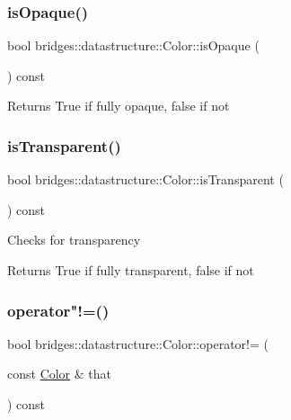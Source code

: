 \subsubsection{\texorpdfstring{is\+Opaque()}{isOpaque()}}
{\footnotesize\ttfamily bool bridges\+::datastructure\+::\+Color\+::is\+Opaque (\begin{DoxyParamCaption}{ }\end{DoxyParamCaption}) const\hspace{0.3cm}{\ttfamily [inline]}}

\begin{DoxyReturn}{Returns}
True if fully opaque, false if not 
\end{DoxyReturn}
\mbox{\label{classbridges_1_1datastructure_1_1_color_a82713b25585724ddcb73d3c209aaaad9}} 
\subsubsection{\texorpdfstring{is\+Transparent()}{isTransparent()}}
{\footnotesize\ttfamily bool bridges\+::datastructure\+::\+Color\+::is\+Transparent (\begin{DoxyParamCaption}{ }\end{DoxyParamCaption}) const\hspace{0.3cm}{\ttfamily [inline]}}

Checks for transparency \begin{DoxyReturn}{Returns}
True if fully transparent, false if not 
\end{DoxyReturn}
\mbox{\label{classbridges_1_1datastructure_1_1_color_aa3eb6797dc6d27681415569cf67d9196}} 
\subsubsection{\texorpdfstring{operator"!=()}{operator!=()}}
{\footnotesize\ttfamily bool bridges\+::datastructure\+::\+Color\+::operator!= (\begin{DoxyParamCaption}\item[{const \hyperlink{classbridges_1_1datastructure_1_1_color}{Color} \&}]{that }\end{DoxyParamCaption}) const\hspace{0.3cm}{\ttfamily [inline]}}

